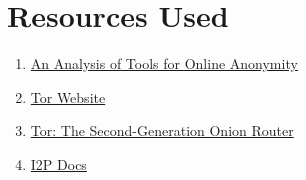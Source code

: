 \documentclass{main}
\begin{document}
\section{Resources Used}
\begin{enumerate}
	\item \href{https://uknowledge.uky.edu/cgi/viewcontent.cgi?article=1022&context=slis\_facpub}{An Analysis of Tools for Online Anonymity}
	\item \href{https://www.torproject.org}{Tor Website}
	\item \href{https://svn-archive.torproject.org/svn/projects/design-paper/tor-design.pdf} {Tor: The Second-Generation Onion Router}
	\item \href{https://geti2p.net/en/docs}{I2P Docs}
\end{enumerate}
\end{document}
